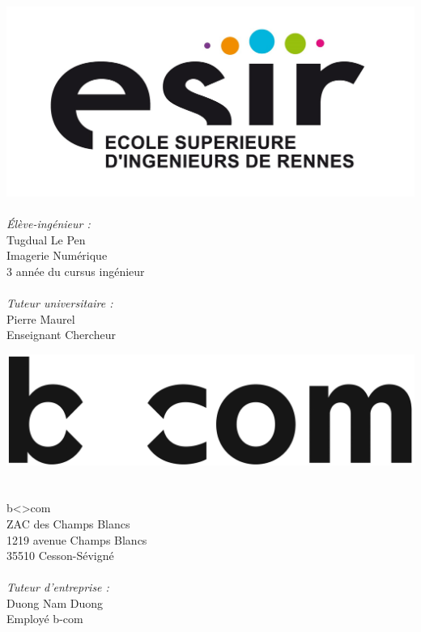 \begin{titlepage}
  \begin{center}

    \begin{minipage}{0.45\textwidth}
      \begin{flushleft} \large
        \includegraphics[width=0.9\columnwidth]{datas/logo_esir.jpg}~\\
        \emph{Élève-ingénieur :}\\
        Tugdual Le Pen\\
        Imagerie Numérique\\
        3 année du cursus ingénieur\\
        ~\\
        \emph{Tuteur universitaire :}\\
        Pierre Maurel\\
        Enseignant Chercheur
      \end{flushleft}
    \end{minipage}
    \begin{minipage}{0.45\textwidth}
      \begin{flushright} \large
        \vspace{19pt}
        \includegraphics[width=0.9\columnwidth]{datas/logo_bcom.jpg}~\\~\\
        b<>com\\
        ZAC des Champs Blancs\\
        1219 avenue Champs Blancs\\
        35510 Cesson-Sévigné\\
        ~\\
        \emph{Tuteur d'entreprise :}\\
        Duong Nam Duong\\
        Employé b-com\\
      \end{flushright}
    \end{minipage}


\end{center}
\end{titlepage}
